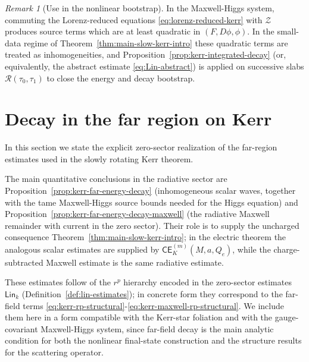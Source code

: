 \documentclass[11pt]{article}
\numberwithin{equation}{section}
\theoremstyle{plain}
\theoremstyle{definition}
\theoremstyle{remark}
\newtheorem{remark}{Remark}[section]
\newcommand{\Lin}{\mathsf{Lin}}
\newcommand{\CElec}{\mathsf{CE}}
\begin{document}
\begin{remark}[Use in the nonlinear bootstrap]\label{rem:kerr-use-nonlinear}
In the Maxwell-Higgs system, commuting the Lorenz-reduced equations \eqref{eq:lorenz-reduced-kerr} with $\mathcal Z$ produces source terms which are at least quadratic in $(F,D\phi,\phi)$.
In the small-data regime of Theorem~\ref{thm:main-slow-kerr-intro} these quadratic terms are treated as inhomogeneities, and Proposition~\ref{prop:kerr-integrated-decay} (or, equivalently, the abstract estimate \eqref{eq:Lin-abstract}) is applied on successive slabs $\mathcal R(\tau_{0},\tau_{1})$ to close the energy and decay bootstrap.
\end{remark}



\section{Decay in the far region on Kerr}\label{sec:kerr-far-decay}

In this section we state the explicit zero-sector realization of the far-region estimates used in the slowly rotating Kerr theorem.

The main quantitative conclusions in the radiative sector are Proposition~\ref{prop:kerr-far-energy-decay} (inhomogeneous scalar waves, together with the tame Maxwell-Higgs source bounds needed for the Higgs equation) and Proposition~\ref{prop:kerr-far-energy-decay-maxwell} (the radiative Maxwell remainder with current in the zero sector). Their role is to supply the uncharged consequence Theorem~\ref{thm:main-slow-kerr-intro}; in the electric theorem the analogous scalar estimates are supplied by \(\CElec^{(m)}_K(M,a,Q_e)\), while the charge-subtracted Maxwell estimate is the same radiative estimate.

These estimates follow of the $r^{p}$ hierarchy encoded in the zero-sector estimates $\Lin_{k}$ (Definition~\ref{def:lin-estimates}); in concrete form they correspond to the far-field terms \eqref{eq:kerr-rp-structural}-\eqref{eq:kerr-maxwell-rp-structural}. We include them here in a form compatible with the Kerr-star foliation and with the gauge-covariant Maxwell-Higgs system, since far-field decay is the main analytic condition for both the nonlinear final-state construction and the structure results for the scattering operator.
\end{document}

